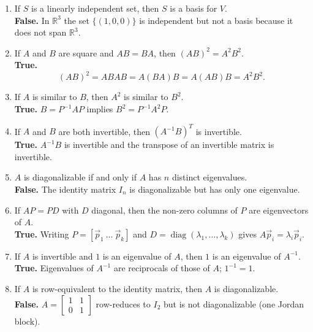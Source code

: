 \documentclass{article}
\begin{document}
\begin{multicols*}{2}
\begin{enumerate}[label=(\alph*)]
    \item If $S$ is a linearly independent set, then $S$ is a basis for $V$.\\
    \textbf{False.}  In $\mathbb R^{3}$ the set $\{(1,0,0)\}$ is independent but not a basis because it does not span $\mathbb R^{3}$.
    
    \item If $A$ and $B$ are square and $AB=BA$, then $(AB)^{2}=A^{2}B^{2}$.\\
    \textbf{True.}
    \[
    (AB)^{2}=ABAB=A(BA)B=A(AB)B=A^{2}B^{2}.
    \]
    
    \item If $A$ is similar to $B$, then $A^{2}$ is similar to $B^{2}$.\\
    \textbf{True.}  $B=P^{-1}AP$ implies $B^{2}=P^{-1}A^{2}P$.
    
    \item If $A$ and $B$ are both invertible, then $(A^{-1}B)^{T}$ is invertible.\\
    \textbf{True.}  $A^{-1}B$ is invertible and the transpose of an invertible matrix is invertible.
    
    \item $A$ is diagonalizable if and only if $A$ has $n$ distinct eigenvalues.\\
    \textbf{False.}  The identity matrix $I_{n}$ is diagonalizable but has only one eigenvalue.
    
    \item If $AP=PD$ with $D$ diagonal, then the non-zero columns of $P$ are eigenvectors of $A$.\\
    \textbf{True.}  Writing $P=[\vec p_{1}\ \dots\ \vec p_{k}]$ and $D=\operatorname{diag}(\lambda_{1},\dots,\lambda_{k})$ gives $A\vec p_{i}=\lambda_{i}\vec p_{i}$.
    
    \item If $A$ is invertible and $1$ is an eigenvalue of $A$, then $1$ is an eigenvalue of $A^{-1}$.\\
    \textbf{True.}  Eigenvalues of $A^{-1}$ are reciprocals of those of $A$; $1^{-1}=1$.
    
    \item If $A$ is row-equivalent to the identity matrix, then $A$ is diagonalizable.\\
    \textbf{False.}  $A=\begin{bmatrix}1&1\\0&1\end{bmatrix}$ row-reduces to $I_{2}$ but is not diagonalizable (one Jordan block).
    

\end{enumerate}
\end{multicols*}
\end{document}
